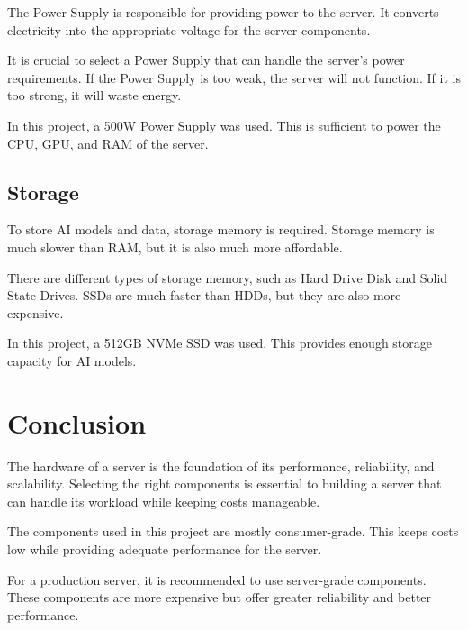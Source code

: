 The Power Supply is responsible for providing power to the server. It converts electricity into the appropriate voltage for the server components.

It is crucial to select a Power Supply that can handle the server's power requirements. If the Power Supply is too weak, the server will not function. If it is too strong, it will waste energy.

In this project, a 500W Power Supply was used. This is sufficient to power the CPU, GPU, and RAM of the server.

\cite{PowerSupply}


\subsection{Storage}

To store AI models and data, storage memory is required. Storage memory is much slower than RAM, but it is also much more affordable. 

There are different types of storage memory, such as Hard Drive Disk and Solid State Drives. SSDs are much faster than HDDs, but they are also more expensive.

In this project, a 512GB NVMe SSD was used. This provides enough storage capacity for AI models.

\cite{DataStorage}

\section{Conclusion}

The hardware of a server is the foundation of its performance, reliability, and scalability. Selecting the right components is essential to building a server that can handle its workload while keeping costs manageable.

The components used in this project are mostly consumer-grade. This keeps costs low while providing adequate performance for the server.

For a production server, it is recommended to use server-grade components. These components are more expensive but offer greater reliability and better performance.
